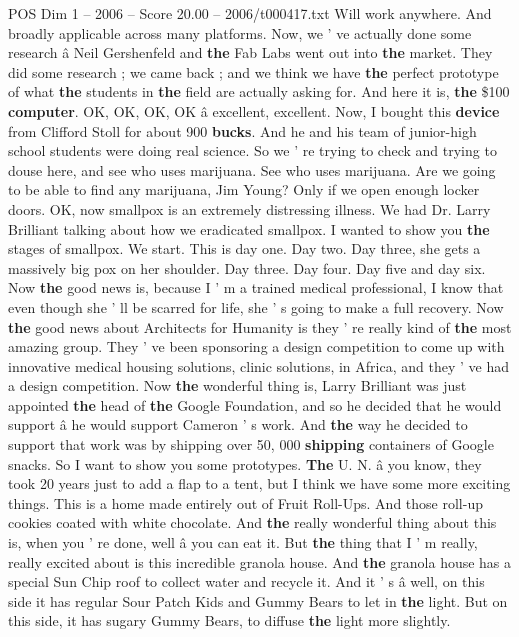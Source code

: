 \begin{textsample}{POS Dim 1 – 2006 – Score 20.00 – 2006/t000417.txt}
Will work anywhere.
And broadly applicable across many platforms.
Now, we ' ve actually done some research â Neil Gershenfeld and \textbf{the} Fab Labs went out into \textbf{the} market.
They did some research ; we came back ; and we think we have \textbf{the} perfect prototype of what \textbf{the} students in \textbf{the} field are actually asking for.
And here it is, \textbf{the} \$100 \textbf{computer}.
OK, OK, OK, OK â excellent, excellent.
Now, I bought this \textbf{device} from Clifford Stoll for about 900 \textbf{bucks}.
And he and his team of junior-high school students were doing real science.
So we ' re trying to check and trying to douse here, and see who uses marijuana.
See who uses marijuana.
Are we going to be able to find any marijuana, Jim Young?
Only if we open enough locker doors.
OK, now smallpox is an extremely distressing illness.
We had Dr.
Larry Brilliant talking about how we eradicated smallpox.
I wanted to show you \textbf{the} stages of smallpox.
We start.
This is day one.
Day two.
Day three, she gets a massively big pox on her shoulder.
Day three.
Day four.
Day five and day six.
Now \textbf{the} good news is, because I ' m a trained medical professional, I know that even though she ' ll be scarred for life, she ' s going to make a full recovery.
Now \textbf{the} good news about Architects for Humanity is they ' re really kind of \textbf{the} most amazing group.
They ' ve been sponsoring a design competition to come up with innovative medical housing solutions, clinic solutions, in Africa, and they ' ve had a design competition.
Now \textbf{the} wonderful thing is, Larry Brilliant was just appointed \textbf{the} head of \textbf{the} Google Foundation, and so he decided that he would support â he would support Cameron ' s work.
And \textbf{the} way he decided to support that work was by shipping over 50, 000 \textbf{shipping} containers of Google snacks.
So I want to show you some prototypes. \textbf{The} U.
N. â you know, they took 20 years just to add a flap to a tent, but I think we have some more exciting things.
This is a home made entirely out of Fruit Roll-Ups.
And those roll-up cookies coated with white chocolate.
And \textbf{the} really wonderful thing about this is, when you ' re done, well â you can eat it.
But \textbf{the} thing that I ' m really, really excited about is this incredible granola house.
And \textbf{the} granola house has a special Sun Chip roof to collect water and recycle it.
And it ' s â well, on this side it has regular Sour Patch Kids and Gummy Bears to let in \textbf{the} light.
But on this side, it has sugary Gummy Bears, to diffuse \textbf{the} light more slightly.

\end{textsample}
